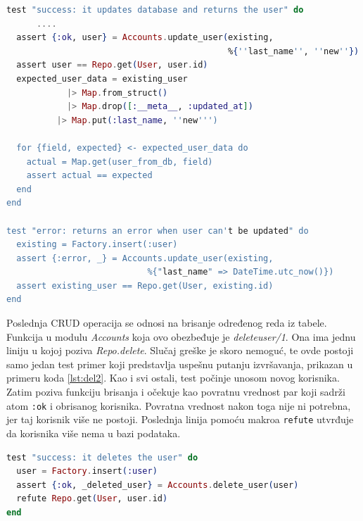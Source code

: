 \documentclass[12pt,oneside]{memoir}
\begin{document}
\begin{minipage}{\linewidth}
\begin{lstlisting}[language=elixir, basicstyle=\small, caption={Testiranje funkcije \emph{update{\textunderscore}user/2}},captionpos=b, label={lst:upd}]
test "success: it updates database and returns the user" do
      .... 
  assert {:ok, user} = Accounts.update_user(existing,
  						                    %{''last_name'', ''new''})
  assert user == Repo.get(User, user.id)
  expected_user_data = existing_user
        	|> Map.from_struct()
        	|> Map.drop([:__meta__, :updated_at])
          |> Map.put(:last_name, ''new''')
          
  for {field, expected} <- expected_user_data do
    actual = Map.get(user_from_db, field)
    assert actual == expected
  end 
end

test "error: returns an error when user can't be updated" do
  existing = Factory.insert(:user)
  assert {:error, _} = Accounts.update_user(existing, 
  							%{"last_name" => DateTime.utc_now()})
  assert existing_user == Repo.get(User, existing.id)
end
 \end{lstlisting}
\end{minipage}

\par Poslednja CRUD operacija se odnosi na brisanje određenog reda iz tabele. Funkcija u modulu \emph{Accounts} koja ovo obezbeđuje je \emph{delete{\textunderscore}user/1}. Ona ima jednu liniju u kojoj poziva \emph{Repo.delete}. Slučaj greške je skoro nemoguć, te ovde postoji samo jedan test primer koji predstavlja uspešnu putanju izvršavanja, prikazan u primeru koda \ref{lst:del2}. Kao i svi ostali, test počinje unosom novog korisnika. Zatim poziva funkciju brisanja i očekuje kao povratnu vrednost par koji sadrži atom \texttt{:ok} i obrisanog korisnika. Povratna vrednost nakon toga nije ni potrebna, jer taj korisnik više ne postoji. Poslednja linija pomoću makroa \texttt{refute} utvrđuje da korisnika više nema u bazi podataka. \\

\begin{minipage}{\linewidth}
\begin{lstlisting}[language=elixir, basicstyle=\small, caption={Testiranje funkcije \emph{delete{\textunderscore}user/1}},captionpos=b, label={lst:del2}]
test "success: it deletes the user" do
  user = Factory.insert(:user)
  assert {:ok, _deleted_user} = Accounts.delete_user(user)
  refute Repo.get(User, user.id)
end
\end{lstlisting}
\end{minipage}
\end{document}
